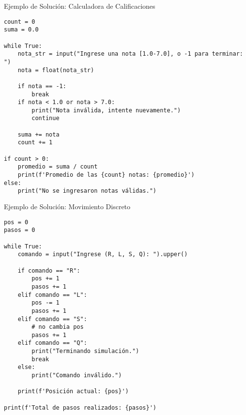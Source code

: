 \documentclass[10pt]{beamer}
\begin{document}
\begin{frame}[fragile]{Ejemplo de Solución: Calculadora de Calificaciones}
\begin{verbatim}
count = 0
suma = 0.0

while True:
    nota_str = input("Ingrese una nota [1.0-7.0], o -1 para terminar: ")
    nota = float(nota_str)

    if nota == -1:
        break
    if nota < 1.0 or nota > 7.0:
        print("Nota inválida, intente nuevamente.")
        continue

    suma += nota
    count += 1

if count > 0:
    promedio = suma / count
    print(f'Promedio de las {count} notas: {promedio}')
else:
    print("No se ingresaron notas válidas.")
\end{verbatim}
\end{frame}

\begin{frame}[fragile]{Ejemplo de Solución: Movimiento Discreto}
\begin{verbatim}
pos = 0
pasos = 0

while True:
    comando = input("Ingrese (R, L, S, Q): ").upper()

    if comando == "R":
        pos += 1
        pasos += 1
    elif comando == "L":
        pos -= 1
        pasos += 1
    elif comando == "S":
        # no cambia pos
        pasos += 1
    elif comando == "Q":
        print("Terminando simulación.")
        break
    else:
        print("Comando inválido.")

    print(f'Posición actual: {pos}')

print(f'Total de pasos realizados: {pasos}')
\end{verbatim}
\end{frame}
\end{document}

